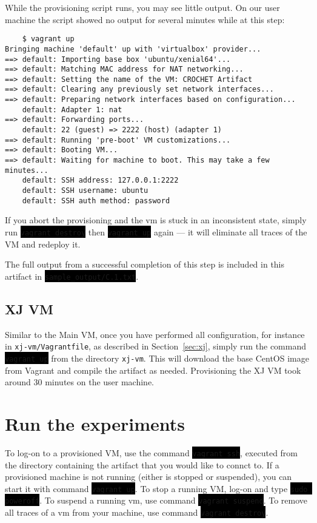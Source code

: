 \documentclass[12pt]{article}
\newcommand{\command}[1]{\colorbox{black}{\texttt{\color{white}#1}}}
\newcommand{\host}[1]{\colorbox{blue!20}{\texttt{\color{black}#1}}}
\begin{document}
While the provisioning script runs, you may see little output. On our user machine the script showed no output for several minutes while at this step:
\begin{verbatim}
	$ vagrant up
Bringing machine 'default' up with 'virtualbox' provider...
==> default: Importing base box 'ubuntu/xenial64'...
==> default: Matching MAC address for NAT networking...
==> default: Setting the name of the VM: CROCHET Artifact
==> default: Clearing any previously set network interfaces...
==> default: Preparing network interfaces based on configuration...
    default: Adapter 1: nat
==> default: Forwarding ports...
    default: 22 (guest) => 2222 (host) (adapter 1)
==> default: Running 'pre-boot' VM customizations...
==> default: Booting VM...
==> default: Waiting for machine to boot. This may take a few minutes...
    default: SSH address: 127.0.0.1:2222
    default: SSH username: ubuntu
    default: SSH auth method: password
\end{verbatim}

If you abort the provisioning and the vm is stuck in an inconsistent state, simply run \command{vagrant destroy} then \command{vagrant up} again --- it will eliminate all traces of the VM and redeploy it.

The full output from a successful completion of this step is included in this artifact in \command{sample\_output/C.1.txt}.

\subsection{XJ VM}

Similar to the Main VM, once you have performed all configuration, for instance in \host{xj-vm/Vagrantfile}, as described in Section~\ref{sec:xj}, simply
run the command \command{vagrant up} from the directory \host{xj-vm}.  This will download the base CentOS image from Vagrant and compile the artifact as needed. Provisioning the
XJ VM took around 30 minutes on the user machine.

\section{Run the experiments}
\label{sec:run}

To log-on to a provisioned VM, use the command \command{vagrant ssh}, executed from the directory containing the artifact that you would like to connct to.  If a provisioned
machine is not running (either is stopped or suspended), you can start it with
command \command{vagrant up}.  To stop a running VM, log-on and type \command{sudo
poweroff}.  To suspend a running vm, use command \command{vagrant suspend}. To remove all traces of a vm from your machine, use command \command{vagrant destroy}.
\end{document}
